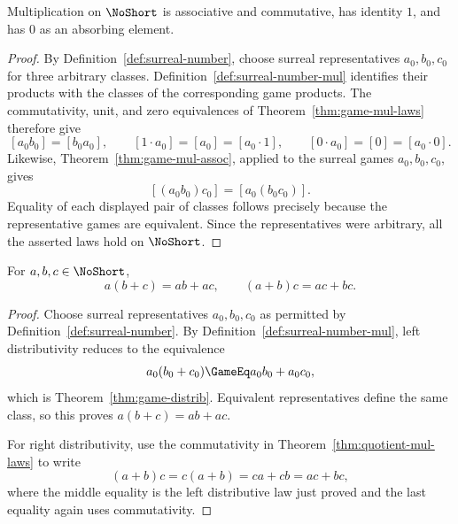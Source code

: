 \begin{theorem}
  \label{thm:quotient-mul-laws}
  \leanok
  Multiplication on \(\NoShort\) is associative and commutative, has identity \(1\), and has
  \(0\) as an absorbing element.
\end{theorem}
\begin{proof}
  \leanok
  By Definition~\ref{def:surreal-number}, choose surreal representatives
  \(a_0,b_0,c_0\) for three arbitrary classes.  Definition~\ref{def:surreal-number-mul}
  identifies their products with the classes of the corresponding game
  products.  The commutativity, unit, and zero equivalences of
  Theorem~\ref{thm:game-mul-laws} therefore give
  \[
    [a_0b_0]=[b_0a_0],\qquad [1\cdot a_0]=[a_0]=[a_0\cdot1],
    \qquad [0\cdot a_0]=[0]=[a_0\cdot0].
  \]
  Likewise, Theorem~\ref{thm:game-mul-assoc}, applied to the surreal games
  \(a_0,b_0,c_0\), gives
  \[
    [(a_0b_0)c_0]=[a_0(b_0c_0)].
  \]
  Equality of each displayed pair of classes follows precisely because the
  representative games are equivalent.  Since the representatives were
  arbitrary, all the asserted laws hold on \(\NoShort\).
\end{proof}

\begin{theorem}
  \label{thm:quotient-distrib}
  \leanok
  For \(a,b,c\in\NoShort\),
  \[
    a(b+c)=ab+ac,
    \qquad
    (a+b)c=ac+bc.
  \]
\end{theorem}
\begin{proof}
  \leanok
  Choose surreal representatives \(a_0,b_0,c_0\) as permitted by
  Definition~\ref{def:surreal-number}.  By
  Definition~\ref{def:surreal-number-mul}, left distributivity reduces to the
  equivalence
  \[
    a_0(b_0+c_0)\GameEq a_0b_0+a_0c_0,
  \]
  which is Theorem~\ref{thm:game-distrib}.  Equivalent representatives define
  the same class, so this proves \(a(b+c)=ab+ac\).

  For right distributivity, use the commutativity in
  Theorem~\ref{thm:quotient-mul-laws} to write
  \[
    (a+b)c=c(a+b)=ca+cb=ac+bc,
  \]
  where the middle equality is the left distributive law just proved and the
  last equality again uses commutativity.
\end{proof}

